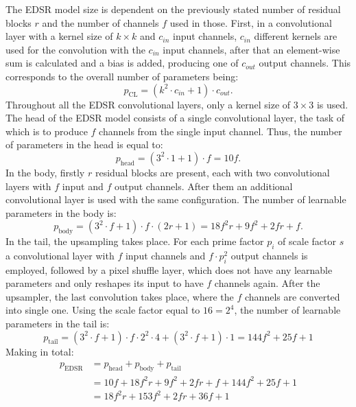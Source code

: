 The EDSR model size is dependent on the previously stated number of residual blocks $r$ and the number of channels $f$ used in those.
First, in a convolutional layer with a kernel size of $k \times k$ and $c_{in}$ input channels, $c_{in}$ different kernels are used for the convolution with the $c_{in}$ input channels, after that an element-wise sum is calculated and a bias is added, producing one of $c_{out}$ output channels.
This corresponds to the overall number of parameters being:
\begin{equation}
    p_\text{CL} = \left(k^2 \cdot c_{in} + 1\right) \cdot c_{out}.
\end{equation}
Throughout all the EDSR convolutional layers, only a kernel size of $3 \times 3$ is used.
The head of the EDSR model consists of a single convolutional layer, the task of which is to produce $f$ channels from the single input channel. 
Thus, the number of parameters in the head is equal to:
\begin{equation}
    p_\text{head} = \left(3^2 \cdot 1 + 1\right) \cdot f = 10f.
\end{equation}
In the body, firstly $r$ residual blocks are present, each with two convolutional layers with $f$ input and $f$ output channels.
After them an additional convolutional layer is used with the same configuration.
The number of learnable parameters in the body is:
\begin{equation}
    p_\text{body} = \left(3^2 \cdot f + 1\right) \cdot f \cdot (2r + 1) = 18f^2r + 9f^2 + 2fr + f.
\end{equation}
In the tail, the upsampling takes place.
For each prime factor $p_i$ of scale factor $s$ a convolutional layer with $f$ input channels and $f\cdot p_i^2$ output channels is employed, followed by a pixel shuffle layer, which does not have any learnable parameters and only reshapes its input to have $f$ channels again.
After the upsampler, the last convolution takes place, where the $f$ channels are converted into single one.
Using the scale factor equal to $16 = 2^4$, the number of learnable parameters in the tail is:
\begin{equation}
    p_\text{tail} = \left(3^2 \cdot f + 1\right) \cdot f \cdot 2^2 \cdot 4 + \left( 3^2 \cdot f + 1 \right) \cdot 1 = 144f^2 + 25f + 1
\end{equation}
Making in total:
\begin{equation}
    \begin{aligned}
        p_\text{EDSR} &= p_\text{head} + p_\text{body} + p_\text{tail} \\
        &= 10f + 18f^2r + 9f^2 + 2fr + f + 144f^2 + 25f + 1 \\
        &= 18f^2r + 153f^2 + 2fr + 36f + 1
    \end{aligned}
    \label{e:edsr_size}
\end{equation}
